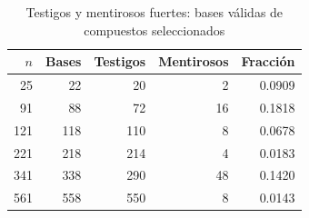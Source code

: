 \begin{table}[H]\centering\small
\caption{Testigos y mentirosos fuertes: bases válidas de compuestos seleccionados}
\label{tab:mentirosos}
\begin{tabular}{rrrrr}\toprule
$n$ & Bases & Testigos & Mentirosos & Fracción \\
\midrule
25 & 22 & 20 & 2 & 0.0909 \\
91 & 88 & 72 & 16 & 0.1818 \\
121 & 118 & 110 & 8 & 0.0678 \\
221 & 218 & 214 & 4 & 0.0183 \\
341 & 338 & 290 & 48 & 0.1420 \\
561 & 558 & 550 & 8 & 0.0143 \\
\bottomrule\end{tabular}\end{table}
